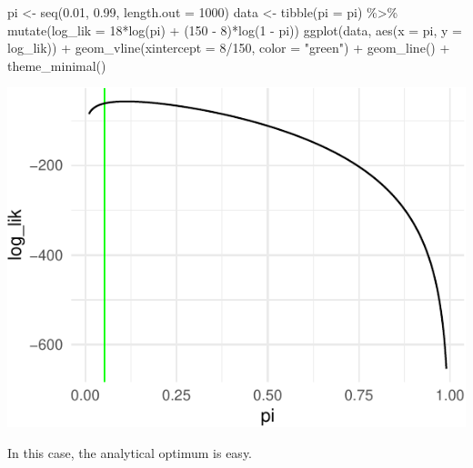 \documentclass[
]{book}
\newenvironment{Shaded}{\begin{snugshade}}{\end{snugshade}}
\newcommand{\AttributeTok}[1]{\textcolor[rgb]{0.77,0.63,0.00}{#1}}
\newcommand{\DecValTok}[1]{\textcolor[rgb]{0.00,0.00,0.81}{#1}}
\newcommand{\FloatTok}[1]{\textcolor[rgb]{0.00,0.00,0.81}{#1}}
\newcommand{\FunctionTok}[1]{\textcolor[rgb]{0.00,0.00,0.00}{#1}}
\newcommand{\NormalTok}[1]{#1}
\newcommand{\OtherTok}[1]{\textcolor[rgb]{0.56,0.35,0.01}{#1}}
\newcommand{\SpecialCharTok}[1]{\textcolor[rgb]{0.00,0.00,0.00}{#1}}
\newcommand{\StringTok}[1]{\textcolor[rgb]{0.31,0.60,0.02}{#1}}
\begin{document}
\begin{Shaded}
\begin{Highlighting}[]
\NormalTok{pi }\OtherTok{\textless{}{-}} \FunctionTok{seq}\NormalTok{(}\FloatTok{0.01}\NormalTok{, }\FloatTok{0.99}\NormalTok{, }\AttributeTok{length.out =} \DecValTok{1000}\NormalTok{)}
\NormalTok{data }\OtherTok{\textless{}{-}} \FunctionTok{tibble}\NormalTok{(}\AttributeTok{pi =}\NormalTok{ pi) }\SpecialCharTok{\%\textgreater{}\%}
  \FunctionTok{mutate}\NormalTok{(}\AttributeTok{log\_lik =} \DecValTok{18}\SpecialCharTok{*}\FunctionTok{log}\NormalTok{(pi) }\SpecialCharTok{+}\NormalTok{ (}\DecValTok{150} \SpecialCharTok{{-}} \DecValTok{8}\NormalTok{)}\SpecialCharTok{*}\FunctionTok{log}\NormalTok{(}\DecValTok{1} \SpecialCharTok{{-}}\NormalTok{ pi))}
\FunctionTok{ggplot}\NormalTok{(data, }\FunctionTok{aes}\NormalTok{(}\AttributeTok{x =}\NormalTok{ pi, }\AttributeTok{y =}\NormalTok{ log\_lik)) }\SpecialCharTok{+} 
  \FunctionTok{geom\_vline}\NormalTok{(}\AttributeTok{xintercept =} \DecValTok{8}\SpecialCharTok{/}\DecValTok{150}\NormalTok{, }\AttributeTok{color =} \StringTok{"green"}\NormalTok{) }\SpecialCharTok{+} 
  \FunctionTok{geom\_line}\NormalTok{() }\SpecialCharTok{+} 
  \FunctionTok{theme\_minimal}\NormalTok{()}
\end{Highlighting}
\end{Shaded}

\includegraphics{01-01-maximum-likelihood_files/figure-latex/unnamed-chunk-2-1.pdf}

In this case, the analytical optimum is easy.
\end{document}
